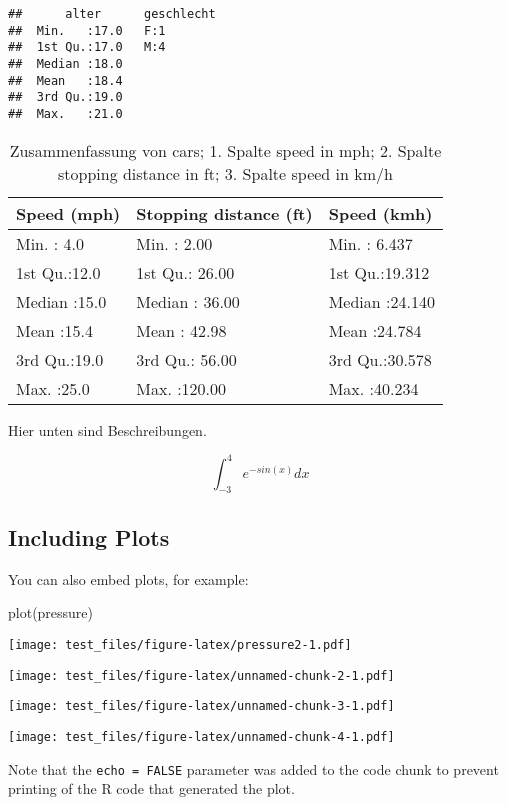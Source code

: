 \documentclass[
]{article}
\newenvironment{Shaded}{\begin{snugshade}}{\end{snugshade}}
\newcommand{\FunctionTok}[1]{\textcolor[rgb]{0.00,0.00,0.00}{#1}}
\newcommand{\NormalTok}[1]{#1}
\begin{document}
\begin{verbatim}
##      alter      geschlecht
##  Min.   :17.0   F:1       
##  1st Qu.:17.0   M:4       
##  Median :18.0             
##  Mean   :18.4             
##  3rd Qu.:19.0             
##  Max.   :21.0
\end{verbatim}

\begin{table}[ht]
\centering
\begin{tabular}{lll}
  \hline
 Speed (mph) & Stopping distance (ft) &  Speed (kmh) \\ 
  \hline
Min.   : 4.0   & Min.   :  2.00   & Min.   : 6.437   \\ 
  1st Qu.:12.0   & 1st Qu.: 26.00   & 1st Qu.:19.312   \\ 
  Median :15.0   & Median : 36.00   & Median :24.140   \\ 
  Mean   :15.4   & Mean   : 42.98   & Mean   :24.784   \\ 
  3rd Qu.:19.0   & 3rd Qu.: 56.00   & 3rd Qu.:30.578   \\ 
  Max.   :25.0   & Max.   :120.00   & Max.   :40.234   \\ 
   \hline
\end{tabular}
\caption{Zusammenfassung von cars; 1. Spalte speed in mph; 2. Spalte stopping distance in ft; 3. Spalte speed in km/h} 
\end{table}

Hier unten sind Beschreibungen.

\[
\int_{-3}^{4}{e^{-sin(x)} dx}
\]

\hypertarget{including-plots}{%
\subsection{Including Plots}\label{including-plots}}

You can also embed plots, for example:

\begin{Shaded}
\begin{Highlighting}[]
\FunctionTok{plot}\NormalTok{(pressure)}
\end{Highlighting}
\end{Shaded}

\texttt{[image: test\_files/figure-latex/pressure2-1.pdf]}

\texttt{[image: test\_files/figure-latex/unnamed-chunk-2-1.pdf]}

\texttt{[image: test\_files/figure-latex/unnamed-chunk-3-1.pdf]}

\texttt{[image: test\_files/figure-latex/unnamed-chunk-4-1.pdf]}

Note that the \texttt{echo\ =\ FALSE} parameter was added to the code
chunk to prevent printing of the R code that generated the plot.
\end{document}

